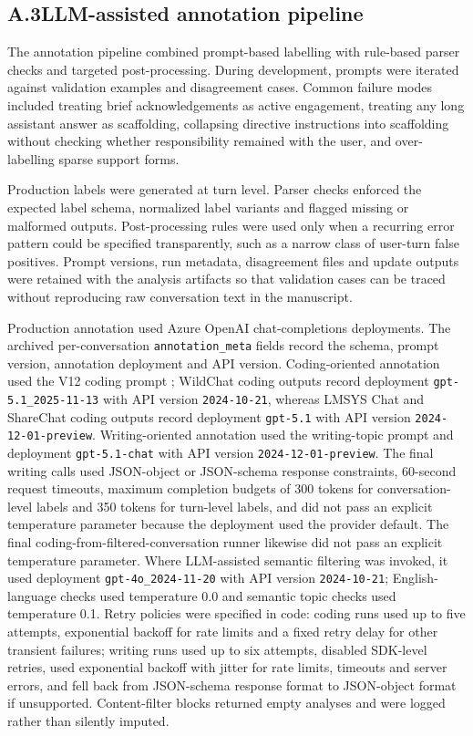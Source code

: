 \subsection*{A.3\quad LLM-assisted annotation pipeline}

The annotation pipeline combined prompt-based labelling with rule-based parser checks and targeted post-processing. During development, prompts were iterated against validation examples and disagreement cases. Common failure modes included treating brief acknowledgements as active engagement, treating any long assistant answer as scaffolding, collapsing directive instructions into scaffolding without checking whether responsibility remained with the user, and over-labelling sparse support forms.

Production labels were generated at turn level. Parser checks enforced the expected label schema, normalized label variants and flagged missing or malformed outputs. Post-processing rules were used only when a recurring error pattern could be specified transparently, such as a narrow class of user-turn false positives. Prompt versions, run metadata, disagreement files and update outputs were retained with the analysis artifacts so that validation cases can be traced without reproducing raw conversation text in the manuscript.

Production annotation used Azure OpenAI chat-completions deployments. The archived per-conversation \texttt{annotation\_meta} fields record the schema, prompt version, annotation deployment and API version. Coding-oriented annotation used the V12 coding prompt ; WildChat coding outputs record deployment \texttt{gpt-5.1\_2025-11-13} with API version \texttt{2024-10-21}, whereas LMSYS Chat and ShareChat coding outputs record deployment \texttt{gpt-5.1} with API version \texttt{2024-12-01-preview}. Writing-oriented annotation used the writing-topic prompt  and deployment \texttt{gpt-5.1-chat} with API version \texttt{2024-12-01-preview}. The final writing calls used JSON-object or JSON-schema response constraints, 60-second request timeouts, maximum completion budgets of 300 tokens for conversation-level labels and 350 tokens for turn-level labels, and did not pass an explicit temperature parameter because the deployment used the provider default. The final coding-from-filtered-conversation runner likewise did not pass an explicit temperature parameter. Where LLM-assisted semantic filtering was invoked, it used deployment \texttt{gpt-4o\_2024-11-20} with API version \texttt{2024-10-21}; English-language checks used temperature 0.0 and semantic topic checks used temperature 0.1. Retry policies were specified in code: coding runs used up to five attempts, exponential backoff for rate limits and a fixed retry delay for other transient failures; writing runs used up to six attempts, disabled SDK-level retries, used exponential backoff with jitter for rate limits, timeouts and server errors, and fell back from JSON-schema response format to JSON-object format if unsupported. Content-filter blocks returned empty analyses and were logged rather than silently imputed.

